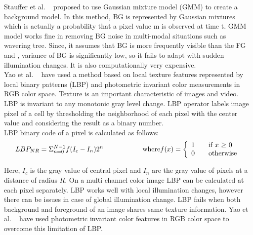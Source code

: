 \indent  Stauffer et al. ~\cite{15} proposed to use Gaussian mixture
model (GMM) to create a background model. In this method, BG is
represented by Gaussian mixtures which is actually a probability that a
pixel value m is observed at time t. GMM model works fine in removing BG
noise in multi-modal situations such as wavering tree. Since, it assumes
that BG is more frequently visible than the FG and , variance of BG is
significantly low, so it fails to adapt with sudden illumination
changes. It is also computationally very expensive.\\ 

\indent Yao et al. ~\cite{11} have used a method based on local texture
features represented by local binary patterns (LBP) and photometric
invariant color measurements in RGB color space. Texture is an important
characteristic of images and video. LBP is invariant to any monotonic
gray level change.  LBP operator labels image pixel of a cell by
thresholding the neighborhood of each pixel with the center value and
considering the result as a binary number.\\

LBP binary code of a pixel is calculated as follows:
\begin{equation}
LBP_{NR} = \Sigma _{n = 0} ^{N - 1} f(I_c - I_n) 2^n \hspace{20 mm} \mathrm{where} f(x) = \left\{ 
  \begin{array}{l l}
     1 & \quad \text{if $x$ $\geq$  $0$}\\
     0 & \quad \text{otherwise}
   \end{array} \right.
\end{equation}

\indent Here, $I_c$ is the gray value of central pixel and $I_n$ are the gray
value of pixels at a distance of radius $R$.  On a multi channel color
image LBP can be calculated at each pixel separately. LBP works well with
local illumination changes, however there can be issues in case of
global illumination change. LBP fails when both background and foreground
of an image shares same texture information. Yao et al. ~\cite{11} have used
photometric invariant color features in RGB color space to overcome this
limitation of LBP.\\

